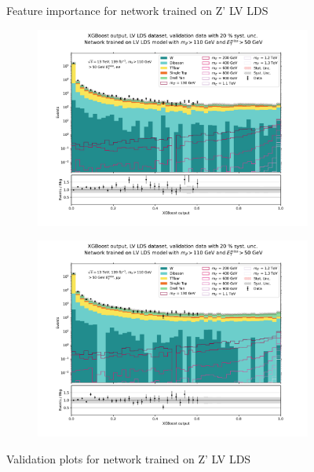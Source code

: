 \documentclass[12pt, a4paper]{book}
\begin{document}
\begin{figure}[!ht]
\begin{subfigure}[b]{0.7\textwidth}
      \end{subfigure}
   \caption{Feature importance for network trained on Z' LV LDS}\label{fig:LV_LDS_feat}
\end{figure}
\begin{figure}[!ht]
	\centering
	\begin{subfigure}[b]{0.49\textwidth}
      \centering
      \includegraphics[width=1\textwidth]{XGBoost/LV_LDS/VAL_ee.pdf}
      \end{subfigure}
   \hfill
   \begin{subfigure}[b]{0.49\textwidth}
      \centering
      \includegraphics[width=1\textwidth]{XGBoost/LV_LDS/VAL_uu.pdf}
      \end{subfigure}
   \caption{Validation plots for network trained on Z' LV LDS}\label{fig:LV_LDS_vals}
\end{figure}
\end{document}
